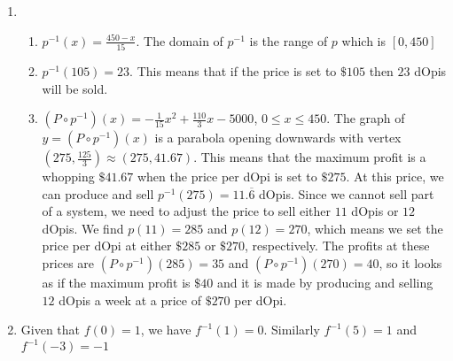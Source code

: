\begin{enumerate}
\setcounter{enumi}{\value{HW}}
\addtocounter{enumi}{4}

\item  

\begin{enumerate}

\item $p^{-1}(x) = \frac{450-x}{15}$.  The domain of $p^{-1}$ is the range of $p$ which is $[0,450]$

\item  $p^{-1}(105) = 23$. This means that if the price is set to $\$105$ then $23$ dOpis will be sold.

\item $\left(P\circ p^{-1}\right)(x) = -\frac{1}{15} x^2 + \frac{110}{3} x - 5000$, $0 \leq x \leq 450$.  The graph of $y = \left(P\circ p^{-1}\right)(x)$ is a parabola opening downwards with vertex $\left(275, \frac{125}{3}\right) \approx (275, 41.67)$.  This means that the maximum profit is a whopping $\$41.67$ when the price per dOpi is set to $\$275$.  At this price, we can produce and sell $p^{-1}(275) = 11.\overline{6}$ dOpis.  Since we cannot sell part of a system, we need to adjust the price to sell either $11$ dOpis or $12$ dOpis. We find $p(11) = 285$ and $p(12) = 270$, which means we set the price per dOpi at either $\$285$ or $\$270$, respectively.  The profits at these prices are $\left(P\circ p^{-1}\right)(285) = 35$ and  $\left(P\circ p^{-1}\right)(270) = 40$, so it looks as if the maximum profit is $\$40$ and it is made by producing and selling $12$ dOpis a week at a price of $\$270$ per dOpi.

\end{enumerate}

\addtocounter{enumi}{1}

\item Given that $f(0) = 1$, we have $f^{-1}(1) = 0$.  Similarly $f^{-1}(5) = 1$ and $f^{-1}(-3) = -1$

\end{enumerate}


\closegraphsfile